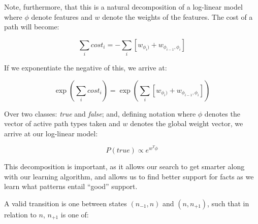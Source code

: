 Note, furthermore, that this is a natural decomposition
  of a log-linear model where $\phi$ denote features
  and $w$ denote the weights of the features.
The cost of a path will become:

\begin{equation}
\sum_i cost_i = - \sum_i \left[ w_{\phi_i)} + w_{\phi_{i-1}, \phi_i}\right]
\end{equation}

If we exponentiate the negative of this, we arrive at:

\begin{equation}
\exp( \sum_i cost_i )
  = \exp\left( \sum_i \left[ w_{\phi_i)} + w_{\phi_{i-1}, \phi_i} \right] \right)
\end{equation}

Over two classes: \textit{true} and \textit{false};
  and, defining notation where $\phi$ denotes the
  vector of active path types taken and $w$ denotes
  the global weight vector, we arrive at our
  log-linear model:

\begin{equation}
P(\textit{true}) \propto e^{w^{T} \phi}
\end{equation}

This decomposition is important, as it allows our
  search to get smarter along with our learning
  algorithm, and allows us to find better support
  for facts as we learn what patterns entail
  ``good'' support.

%


A valid transition is one between states
  $(n_{-1}, n)$ and $(n, n_{+1})$, such that in
  relation to $n$, $n_{+1}$ is one of:

